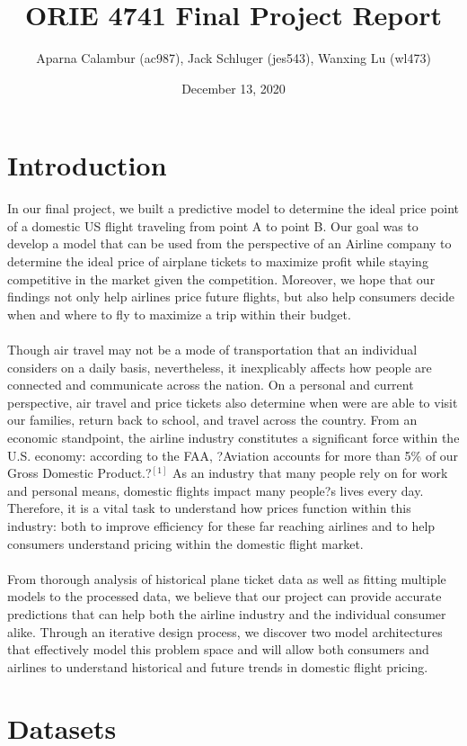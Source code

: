 \documentclass{article}
\title{ORIE 4741 Final Project Report}
\author{Aparna Calambur (ac987), Jack Schluger (jes543), Wanxing Lu (wl473)}
\date{December 13, 2020}
\begin{document}
\twocolumn
\maketitle

\section{Introduction}
In our final project, we built a predictive model to determine the ideal price point of a domestic US flight traveling from point A to point B. Our goal was to develop a model that can be used from the perspective of an Airline company to determine the ideal price of airplane tickets to maximize profit while staying competitive in the market given the competition. Moreover, we hope that our findings not only help airlines price future flights, but also help consumers decide when and where to fly to maximize a trip within their budget.\\\\
Though air travel may not be a mode of transportation that an individual considers on a daily basis, nevertheless, it inexplicably affects how people are connected and communicate across the nation. On a personal and current perspective, air travel and price tickets also determine when were are able to visit our families, return back to school, and travel across the country. From an economic standpoint, the airline industry constitutes a significant force within the U.S. economy: according to the FAA, ?Aviation accounts for more than 5\% of our Gross Domestic Product.?$^{[1]}$ As an industry that many people rely on for work and personal means, domestic flights impact many people?s lives every day. Therefore, it is a vital task to understand how prices function within this industry: both to improve efficiency for these far reaching airlines and to help consumers understand pricing within the domestic flight market.\\\\
From thorough analysis of historical plane ticket data as well as fitting multiple models to the processed data, we believe that our project can provide accurate predictions that can help both the airline industry and the individual consumer alike. Through an iterative design process, we discover two model architectures that effectively model this problem space and will allow both consumers and airlines to understand historical and future trends in domestic flight pricing. 


\section{Datasets}
\end{document}
